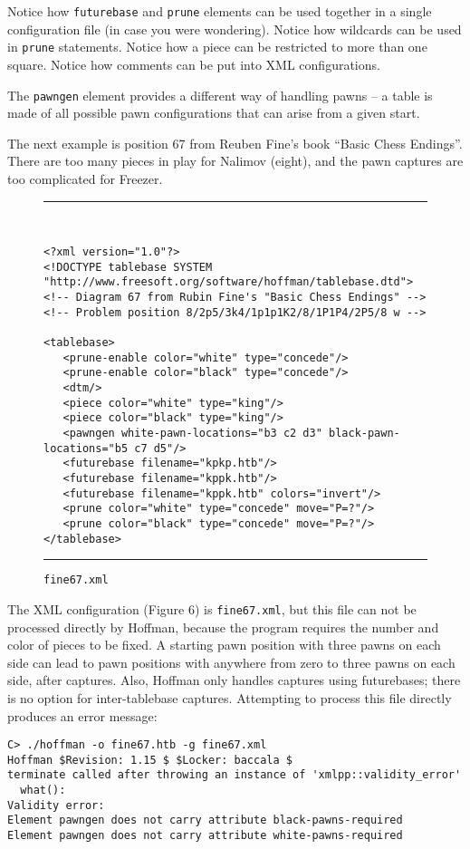 \documentclass[11pt]{article}
\begin{document}
Notice how {\tt futurebase} and {\tt prune} elements can be used
together in a single configuration file (in case you were wondering).
Notice how wildcards can be used in {\tt prune} statements.  Notice
how a piece can be restricted to more than one square.  Notice how
comments can be put into XML configurations.

The {\tt pawngen} element provides a different way of handling pawns
-- a table is made of all possible pawn configurations that can
arise from a given start.

The next example is position 67 from Reuben Fine's book ``Basic Chess
Endings''.  There are too many pieces in play for Nalimov (eight), and
the pawn captures are too complicated for Freezer.

\showboard

\begin{figure}
\hrule\ 
{\small\begin{verbatim}
<?xml version="1.0"?>
<!DOCTYPE tablebase SYSTEM "http://www.freesoft.org/software/hoffman/tablebase.dtd">
<!-- Diagram 67 from Rubin Fine's "Basic Chess Endings" -->
<!-- Problem position 8/2p5/3k4/1p1p1K2/8/1P1P4/2P5/8 w -->

<tablebase>
   <prune-enable color="white" type="concede"/>
   <prune-enable color="black" type="concede"/>
   <dtm/>
   <piece color="white" type="king"/>
   <piece color="black" type="king"/>
   <pawngen white-pawn-locations="b3 c2 d3" black-pawn-locations="b5 c7 d5"/>
   <futurebase filename="kpkp.htb"/>
   <futurebase filename="kppk.htb"/>
   <futurebase filename="kppk.htb" colors="invert"/>
   <prune color="white" type="concede" move="P=?"/>
   <prune color="black" type="concede" move="P=?"/>
</tablebase>
\end{verbatim}}
\hrule
\caption{\tt fine67.xml}
\end{figure}

The XML configuration (Figure 6) is {\tt fine67.xml}, but this file
can not be processed directly by Hoffman, because the program requires
the number and color of pieces to be fixed.  A starting pawn position
with three pawns on each side can lead to pawn positions with anywhere
from zero to three pawns on each side, after captures.  Also, Hoffman
only handles captures using futurebases; there is no option for
inter-tablebase captures.  Attempting to process this file
directly produces an error message:

\begin{verbatim}
C> ./hoffman -o fine67.htb -g fine67.xml
Hoffman $Revision: 1.15 $ $Locker: baccala $
terminate called after throwing an instance of 'xmlpp::validity_error'
  what():  
Validity error:
Element pawngen does not carry attribute black-pawns-required
Element pawngen does not carry attribute white-pawns-required


\end{verbatim}
\end{document}
